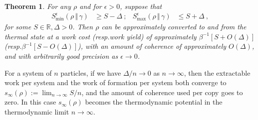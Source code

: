 \documentclass[prl,reprint,longbibliography,superscriptaddress]{revtex4-1}
\newcounter{thm}
\newtheorem{maintheorem}[thm]{Theorem}
\begin{document}
\begin{maintheorem}
  \label{mainthm:equipartition-implies-reversibility-by-TO}
  For any $\rho$ and for $\epsilon>0$, suppose that
  \begin{align*}
    {S}_{\mathrm{min}}^{\epsilon}(\rho\,\Vert\,\gamma) &\geqslant S-\Delta\ ;
    &
    {S}_{\mathrm{max}}^{\epsilon}(\rho\,\Vert\,\gamma) &\leqslant S+\Delta\ ,
  \end{align*}
  for some $S\in\mathbb{R}, \Delta>0$.  Then $\rho$ can be approximately
  converted to and from the thermal state at a work cost (resp.\@ work yield) of
  approximately $\beta^{-1}[S+O(\Delta)]$ (resp.\@ $\beta^{-1}[S-O(\Delta)]$),
  with an amount of coherence of approximately $O(\Delta)$, and with arbitrarily
  good precision as $\epsilon\to0$.
\end{maintheorem}

For a system of $n$ particles, if we have $\Delta/n \to 0$ as $n\to\infty$, then
the extractable work per system and the work of formation per system both
converge to $s_\infty(\rho) := \lim_{n\to\infty} S/n$, and the amount of
coherence used per copy goes to zero.  In this case $s_\infty(\rho)$ becomes the
thermodynamic potential in the thermodynamic limit $n\to\infty$.
\end{document}
